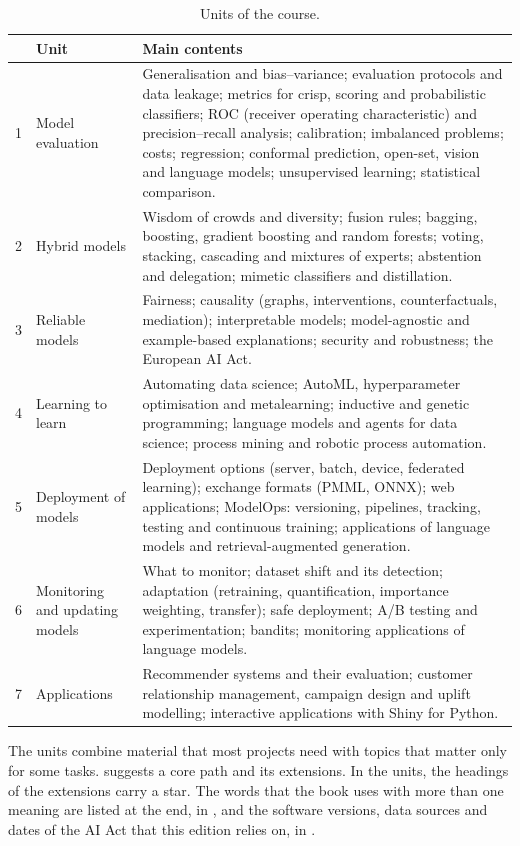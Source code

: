 \begin{table}[htbp]
\centering\small
\caption{Units of the course.}\label{tab:units}
\begin{tabularx}{\textwidth}{@{}l>{\raggedright\arraybackslash}p{3.6cm}X@{}}
\toprule
& Unit & Main contents\\
\midrule
1 & Model evaluation & Generalisation and bias--variance; evaluation protocols and data leakage;
metrics for crisp, scoring and probabilistic classifiers; ROC (receiver operating characteristic) and precision--recall analysis; calibration;
imbalanced problems; costs; regression; conformal prediction, open-set, vision and language models;
unsupervised learning; statistical comparison.\\
2 & Hybrid models & Wisdom of crowds and diversity; fusion rules; bagging, boosting, gradient boosting and
random forests; voting, stacking, cascading and mixtures of experts; abstention and delegation; mimetic
classifiers and distillation.\\
3 & Reliable models & Fairness; causality (graphs, interventions, counterfactuals, mediation); interpretable
models; model-agnostic and example-based explanations; security and robustness; the European AI Act.\\
4 & Learning to learn & Automating data science; AutoML, hyperparameter optimisation and metalearning;
inductive and genetic programming; language models and agents for data science; process mining and robotic
process automation.\\
5 & Deployment of models & Deployment options (server, batch, device, federated learning); exchange
formats (PMML, ONNX); web applications; ModelOps: versioning, pipelines, tracking, testing and continuous
training; applications of language models and retrieval-augmented generation.\\
6 & Monitoring and updating models & What to monitor; dataset shift and its detection; adaptation
(retraining, quantification, importance weighting, transfer); safe deployment; A/B testing and
experimentation; bandits; monitoring applications of language models.\\
7 & Applications & Recommender systems and their evaluation; customer relationship management, campaign
design and uplift modelling; interactive applications with Shiny for Python.\\
\bottomrule
\end{tabularx}
\end{table}

The units combine material that most projects need with topics that matter only for some tasks.
 suggests a core path and its extensions. In the units, the headings of the extensions carry a star\extsec. The words that the book uses with more than one meaning are listed at the end, in
, and the software versions, data sources and dates of the AI Act that this edition relies on, in .


